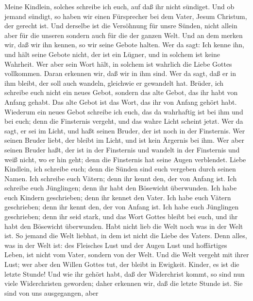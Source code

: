  Meine Kindlein, solches schreibe ich euch, auf daß ihr
nicht sündiget. Und ob jemand sündigt, so haben wir einen Fürsprecher
bei dem Vater, Jesum Christum, der gerecht ist.  Und
derselbe ist die Versöhnung für unsre Sünden, nicht allein aber für die
unseren sondern auch für die der ganzen Welt.  Und an dem
merken wir, daß wir ihn kennen, so wir seine Gebote halten. 
Wer da sagt: Ich kenne ihn, und hält seine Gebote nicht, der ist ein
Lügner, und in solchem ist keine Wahrheit.  Wer aber sein
Wort hält, in solchem ist wahrlich die Liebe Gottes vollkommen. Daran
erkennen wir, daß wir in ihm sind.  Wer da sagt, daß er in
ihm bleibt, der soll auch wandeln, gleichwie er gewandelt hat.
 Brüder, ich schreibe euch nicht ein neues Gebot, sondern
das alte Gebot, das ihr habt von Anfang gehabt. Das alte Gebot ist das
Wort, das ihr von Anfang gehört habt.  Wiederum ein neues
Gebot schreibe ich euch, das da wahrhaftig ist bei ihm und bei euch;
denn die Finsternis vergeht, und das wahre Licht scheint jetzt.
 Wer da sagt, er sei im Licht, und haßt seinen Bruder, der
ist noch in der Finsternis.  Wer seinen Bruder liebt, der
bleibt im Licht, und ist kein Ärgernis bei ihm.  Wer aber
seinen Bruder haßt, der ist in der Finsternis und wandelt in der
Finsternis und weiß nicht, wo er hin geht; denn die Finsternis hat seine
Augen verblendet.  Liebe Kindlein, ich schreibe euch; denn
die Sünden sind euch vergeben durch seinen Namen.  Ich
schreibe euch Vätern; denn ihr kennt den, der von Anfang ist. Ich
schreibe euch Jünglingen; denn ihr habt den Bösewicht überwunden.
 Ich habe euch Kindern geschrieben; denn ihr kennet den
Vater. Ich habe euch Vätern geschrieben; denn ihr kennt den, der von
Anfang ist. Ich habe euch Jünglingen geschrieben; denn ihr seid stark,
und das Wort Gottes bleibt bei euch, und ihr habt den Bösewicht
überwunden.  Habt nicht lieb die Welt noch was in der Welt
ist. So jemand die Welt liebhat, in dem ist nicht die Liebe des Vaters.
 Denn alles, was in der Welt ist: des Fleisches Lust und
der Augen Lust und hoffärtiges Leben, ist nicht vom Vater, sondern von
der Welt.  Und die Welt vergeht mit ihrer Lust; wer aber
den Willen Gottes tut, der bleibt in Ewigkeit.  Kinder, es
ist die letzte Stunde! Und wie ihr gehört habt, daß der Widerchrist
kommt, so sind nun viele Widerchristen geworden; daher erkennen wir, daß
die letzte Stunde ist.  Sie sind von uns ausgegangen, aber
